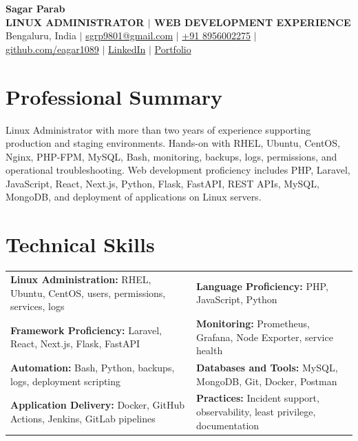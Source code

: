 \documentclass[9pt,a4paper]{article}
\newcommand{\skill}[2]{\textbf{\color{dark}#1:} #2}
\begin{document}
\fontsize{8.7}{10.4}\selectfont
{\fontsize{22}{23}\selectfont\bfseries\color{dark} Sagar Parab}\\[2pt]
{\bfseries\color{accent} LINUX ADMINISTRATOR $|$ WEB DEVELOPMENT EXPERIENCE}\\[3pt]
{\footnotesize Bengaluru, India $|$ \href{mailto:sgrp9801@gmail.com}{sgrp9801@gmail.com} $|$ \href{tel:+918956002275}{+91 8956002275} $|$
\href{https://github.com/eagar1089}{github.com/eagar1089} $|$ \href{https://www.linkedin.com/in/sagarparab0189}{LinkedIn} $|$ \href{https://v1eagarolio.vercel.app}{Portfolio}}

\section{Professional Summary}
Linux Administrator with more than two years of experience supporting production and staging environments. Hands-on with RHEL, Ubuntu, CentOS, Nginx, PHP-FPM, MySQL, Bash, monitoring, backups, logs, permissions, and operational troubleshooting. Web development proficiency includes PHP, Laravel, JavaScript, React, Next.js, Python, Flask, FastAPI, REST APIs, MySQL, MongoDB, and deployment of applications on Linux servers.

\section{Technical Skills}
\begin{tabularx}{\textwidth}{@{}X X@{}}
\skill{Linux Administration}{RHEL, Ubuntu, CentOS, users, permissions, services, logs} &
\skill{Language Proficiency}{PHP, JavaScript, Python}\\
\skill{Framework Proficiency}{Laravel, React, Next.js, Flask, FastAPI} &
\skill{Monitoring}{Prometheus, Grafana, Node Exporter, service health}\\
\skill{Automation}{Bash, Python, backups, logs, deployment scripting} &
\skill{Databases and Tools}{MySQL, MongoDB, Git, Docker, Postman}\\
\skill{Application Delivery}{Docker, GitHub Actions, Jenkins, GitLab pipelines} &
\skill{Practices}{Incident support, observability, least privilege, documentation}
\end{tabularx}
\end{document}
